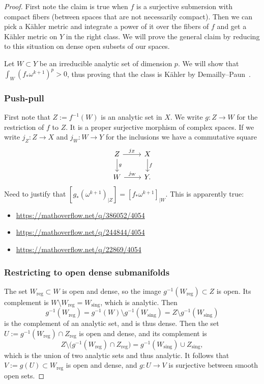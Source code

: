 \documentclass[11pt]{amsart}
\theoremstyle{definition}
\begin{document}
\begin{proof}
First note the claim is true when $f$ is a surjective submersion with compact fibers (between spaces that are not necessarily compact).
Then we can pick a K\"ahler metric and integrate a power of it over the fibers of $f$ and get a K\"ahler metric on $Y$ in the right class.
We will prove the general claim by reducing to this situation on dense open subsets of our spaces.

Let $W \subset Y$ be an irreducible analytic set of dimension $p$.
We will show that $\int_W (f_*\omega^{k+1})^p > 0$, thus proving that the class is K\"ahler by Demailly--Paun~\cite{demailly2004numerical}.

\subsubsection*{Push-pull}

First note that $Z := f^{-1}(W)$ is an analytic set in $X$.
We write $g : Z \to W$ for the restriction of $f$ to $Z$.
It is a proper surjective morphism of complex spaces.
If we write $j_Z : Z \to X$ and $j_W : W \to Y$ for the inclusions we have a commutative square
\[
\begin{tikzcd}
Z \ar[r,"j_Z"] \ar[d,"g"] &
X \ar[d,"f"]
\\
W \ar[r,"j_W"] &
Y.
\end{tikzcd}
\]
Need to justify that $[g_*(\omega^{k+1})_{|Z}] = [f_*\omega^{k+1}]_{|W}$.
This is apparently true:
\begin{itemize}
\item
\url{https://mathoverflow.net/q/386052/4054}

\item
\url{https://mathoverflow.net/q/244844/4054}

\item
\url{https://mathoverflow.net/q/22869/4054}
\end{itemize}


\subsubsection*{Restricting to open dense submanifolds}

The set $W_{\text{reg}} \subset W$ is open and dense, so the image $g^{-1}(W_{\text{reg}}) \subset Z$ is open.
Its complement is $W \setminus W_{\text{reg}} = W_{\text{sing}}$, which is analytic.
Then 
\[
g^{-1}(W_{\text{reg}}) 
= g^{-1}(W) \setminus g^{-1}(W_{\text{sing}})
= Z \setminus g^{-1}(W_{\text{sing}})
\]
is the complement of an analytic set, and is thus dense.
Then the set $U := g^{-1}(W_{\text{reg}}) \cap Z_{\text{reg}}$ is open and dense, and its complement is
\[
Z \setminus \bigl( g^{-1}(W_{\text{reg}}) \cap Z_{\text{reg}} \bigr)
= g^{-1}(W_{\text{sing}})
\cup Z_{\text{sing}},
\]
which is the union of two analytic sets and thus analytic.
It follows that $V := g(U) \subset W_{\text{reg}}$ is open and dense, and $g : U \to V$ is surjective between smooth open sets.


\end{proof}
\end{document}
